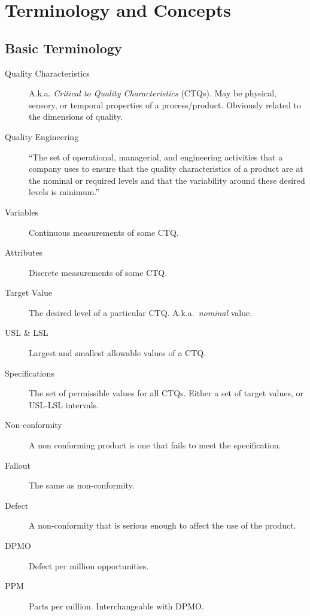 \documentclass[12pt,a4paper]{report}
\theoremstyle{plain}
\theoremstyle{definition}
\begin{document}
\section{Terminology and Concepts}

\subsection{Basic Terminology}

\begin{description}
\item [Quality Characteristics] A.k.a. \emph{Critical to Quality Characteristics} (CTQs). May be physical, sensory, or temporal properties of a process/product. Obviously related to the dimensions of quality. 

\item [Quality Engineering] ``The set of operational, managerial, and engineering activities
that a company uses to ensure that the quality characteristics of a product are at the nominal
or required levels and that the variability around these desired levels is minimum.'' \citep{montgomery_introduction_2007}
\item [Variables] Continuous measurements of some CTQ.
\item [Attributes] Discrete measurements of some CTQ.
\item [Target Value] The desired level of a particular CTQ. A.k.a.\ \emph{nominal} value. 
\item [USL \& LSL] Largest and smallest allowable values of a CTQ.
\item [Specifications] The set of permissible values for all CTQs. Either a set of target values, or USL-LSL intervals. 
\item [Non-conformity] A non conforming product is one that fails to meet the specification.
\item [Fallout] The same as non-conformity.
\item [Defect] A non-conformity that is serious enough to affect the use of the product.
\item [DPMO] Defect per million opportunities. 
\item [PPM] Parts per million. Interchangeable with DPMO.
\end{description}
\end{document}
